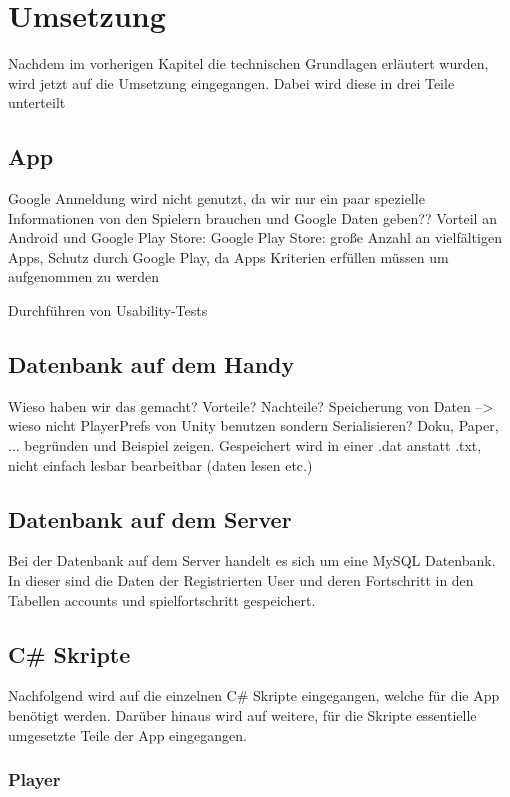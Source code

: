 \chapter{Umsetzung}

Nachdem im vorherigen Kapitel die technischen Grundlagen erläutert wurden, wird jetzt auf die Umsetzung eingegangen. Dabei wird diese in drei Teile unterteilt

\section{App}
Google Anmeldung wird nicht genutzt, da wir nur ein paar spezielle Informationen von den Spielern brauchen und Google Daten geben??
Vorteil an Android und Google Play Store: Google Play Store: große Anzahl an vielfältigen Apps, Schutz durch Google Play, da Apps Kriterien erfüllen müssen um aufgenommen zu werden

		Durchführen von Usability-Tests

\section{Datenbank auf dem Handy}
Wieso haben wir das gemacht? Vorteile? Nachteile?
Speicherung von Daten --> wieso nicht PlayerPrefs von Unity benutzen sondern Serialisieren? Doku, Paper, ... begründen und Beispiel zeigen. Gespeichert wird in einer .dat anstatt .txt, nicht einfach lesbar bearbeitbar (daten lesen etc.)
	
\section{Datenbank auf dem Server}
Bei der Datenbank auf dem Server handelt es sich um eine MySQL Datenbank. In dieser sind die Daten der Registrierten User und deren Fortschritt in den Tabellen accounts und spielfortschritt gespeichert.

\section{C\# Skripte}

Nachfolgend wird auf die einzelnen C\# Skripte eingegangen, welche für die App benötigt werden. Darüber hinaus wird auf weitere, für die Skripte essentielle umgesetzte Teile der App eingegangen.

\subsection{Player}

